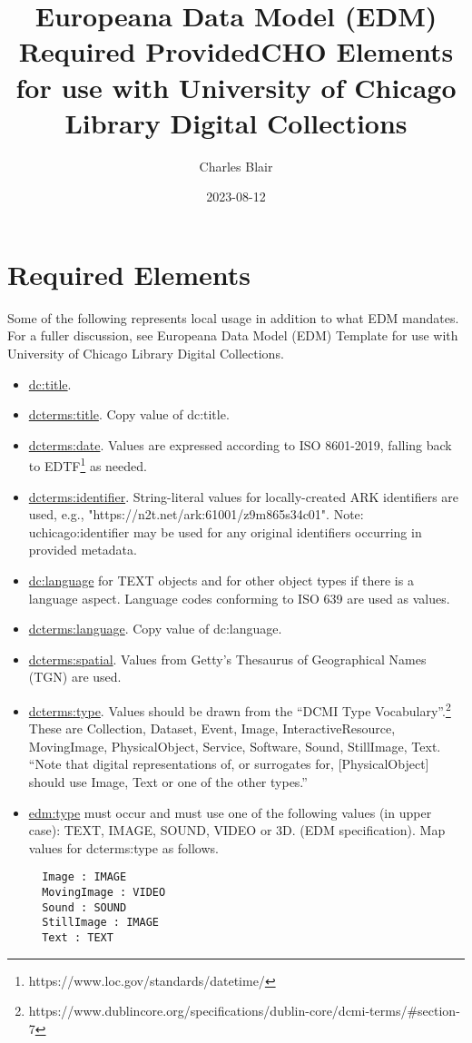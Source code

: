 \documentclass[11pt]{article}
\date{2023-08-12}
\title{Europeana Data Model (EDM) Required ProvidedCHO Elements for use with University of Chicago Library Digital Collections}
\author{Charles Blair}
\begin{document}
\maketitle

\section*{Required Elements}
Some of the following represents local usage in addition to what EDM mandates. For a fuller discussion, see Europeana Data Model (EDM) Template for use with University of Chicago Library Digital Collections.

\begin{itemize}

  \item \underline{dc:title}.

  \item \underline{dcterms:title}. Copy value of dc:title.

  \item \underline{dcterms:date}. Values are expressed according to ISO 8601-2019, falling back to EDTF\footnote{https://www.loc.gov/standards/datetime/} as needed.

  \item \underline{dcterms:identifier}. String-literal values for locally-created ARK identifiers are used, e.g., "https://n2t.net/ark:61001/z9m865s34c01". Note: uchicago:identifier may be used for any original identifiers occurring in provided metadata.

  \item \underline{dc:language} for TEXT objects and for other object types if there is a language aspect. Language codes conforming to ISO 639 are used as values.

  \item \underline{dcterms:language}. Copy value of dc:language.

  \item \underline{dcterms:spatial}. Values from Getty's Thesaurus of Geographical Names (TGN) are used.

  \item \underline{dcterms:type}. Values should be drawn from the ``DCMI Type Vocabulary''.\footnote{https://www.dublincore.org/specifications/dublin-core/dcmi-terms/\#section-7} These are Collection, Dataset, Event, Image, InteractiveResource, MovingImage, PhysicalObject, Service, Software, Sound, StillImage, Text. ``Note that digital representations of, or surrogates for, [PhysicalObject] should use Image, Text or one of the other types.''

  \item \underline{edm:type} must occur and must use one of the following values (in upper case): TEXT, IMAGE, SOUND, VIDEO or 3D. (EDM specification). Map values for dcterms:type as follows.

\begin{verbatim}
  Image : IMAGE
  MovingImage : VIDEO
  Sound : SOUND
  StillImage : IMAGE
  Text : TEXT
\end{verbatim}

\end{itemize}
\end{document}
